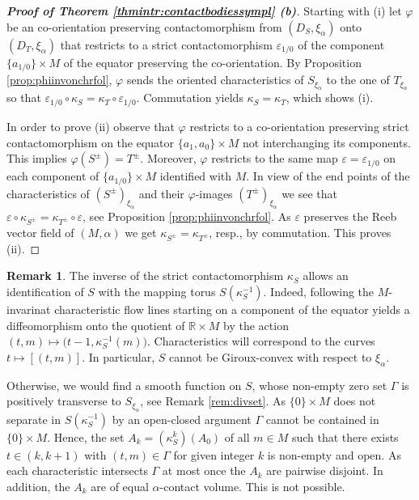 \documentclass{amsart}
\theoremstyle{definition}
\newtheorem{rem}[prop]{Remark}
\newcommand{\R}{\mathbb R}
\begin{document}
\begin{proof}[{\bf Proof of Theorem
\ref{thmintr:contactbodiessympl} (b)}]
  Starting with (i)
  let $\varphi$ be an co-orientation
  preserving contactomorphism
  from $(D_S,\xi_{\alpha})$ onto $(D_T,\xi_{\alpha})$
  that restricts to a strict contactomorphism
  $\varepsilon_{1/0}$ of the component
  $\{a_{1/0}\}\times M$ of the equator
  preserving the co-orientation.
  By Proposition \ref{prop:phiinvonchrfol},
  $\varphi$ sends the oriented characteristics of
  $S_{\xi_{\alpha}}$ to the one of
  $T_{\xi_{\alpha}}$ so that
  $
  \varepsilon_{1/0}\circ\kappa_S=
  \kappa_T\circ\varepsilon_{1/0}
  $.
  Commutation yields $\kappa_S=\kappa_T$,
  which shows (i).
  
  In order to prove (ii)
  observe that $\varphi$ restricts to
  a co-orientation preserving strict contactomorphism
  on the equator $\{a_1,a_0\}\times M$
  not interchanging its components.
  This implies $\varphi(S^{\pm})=T^{\pm}$. 
  Moreover,
  $\varphi$ restricts to the same map
  $\varepsilon=\varepsilon_{1/0}$
  on each component of $\{a_{1/0}\}\times M$
  identified with $M$.
  In view of the end points of the
  characteristics of $(S^{\pm})_{\xi_{\alpha}}$
  and their $\varphi$-images $(T^{\pm})_{\xi_{\alpha}}$
  we see that
  $\varepsilon\circ\kappa_{S^{\pm}}=
  \kappa_{T^{\pm}}\circ\varepsilon$,
  see Proposition \ref{prop:phiinvonchrfol}.
  As $\varepsilon$ preserves
  the Reeb vector field of $(M,\alpha)$
  we get $\kappa_{S^{\pm}}=\kappa_{T^{\pm}}$, resp.,
  by commutation.  
  This proves (ii).
\end{proof}


\begin{rem}
\label{rem:nongirouxconvex}
  The inverse of the strict contactomorphism $\kappa_S$
  allows an identification of $S$ with the mapping torus
  $S(\kappa_S^{-1})$.
  Indeed,
  following the $M$-invarinat characteristic flow lines
  starting on a component of the equator
  yields a diffeomorphism onto the quotient
  of $\R\times M$ by the action
  $(t,m)\mapsto\big(t-1,\kappa_S^{-1}(m)\big)$.
  Characteristics will correspond to the curves
  $t\mapsto[(t,m)]$.
  In particular,
  $S$ cannot be Giroux-convex with respect to $\xi_{\alpha}$.
  
  Otherwise,
  we would find a smooth function on $S$,
  whose non-empty zero set $\Gamma$ is positively
  transverse to $S_{\xi_{\alpha}}$,
  see Remark \ref{rem:divset}.
  As $\{0\}\times M$ does not separate in $S(\kappa_S^{-1})$
  by an open-closed argument $\Gamma$ cannot be contained
  in $\{0\}\times M$.
  Hence,
  the set $A_k=(\kappa_S^k)(A_0)$ of all $m\in M$
  such that there exists $t\in(k,k+1)$ with $(t,m)\in\Gamma$
  for given integer $k$ is non-empty and open.
  As each characteristic intersects $\Gamma$
  at most once the $A_k$ are pairwise disjoint.
  In addition,
  the $A_k$ are of equal $\alpha$-contact volume.
  This is not possible.
  \end{rem}
\end{document}
